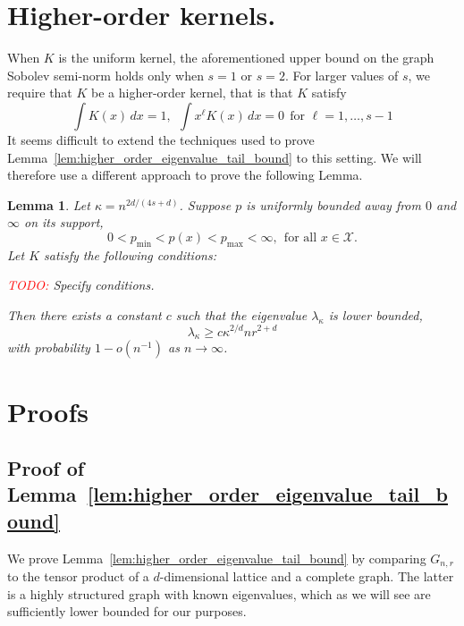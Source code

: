 \documentclass{article}
\newcommand{\1}{\mathbf{1}}
\newcommand{\Xset}{\mathcal{X}}
\theoremstyle{alden}
\theoremstyle{aldenthm}
\newtheorem{lemma}{Lemma}
\theoremstyle{definition}
\theoremstyle{remark}
\begin{document}
\section{Higher-order kernels.}
When $K$ is the uniform kernel, the aforementioned upper bound on the graph Sobolev semi-norm holds only when $s = 1$ or $s = 2$. For larger values of $s$, we require that $K$ be a higher-order kernel, that is that $K$ satisfy
\begin{equation*}
\int K(x) \,dx = 1,~~ \int x^{\ell}K(x) \,dx = 0~~\textrm{for $\ell = 1,\ldots,s-1$}
\end{equation*}
It seems difficult to extend the techniques used to prove Lemma~\ref{lem:higher_order_eigenvalue_tail_bound} to this setting. We will therefore use a different approach to prove the following Lemma.
\begin{lemma}
	Let $\kappa = n^{2d/(4s + d)}$. Suppose $p$ is uniformly bounded away from $0$ and $\infty$ on its support,
	\begin{equation*}
	0 < p_{\min} < p(x) < p_{\max} < \infty,~~\textrm{for all $x \in \Xset$.}
	\end{equation*}
	Let $K$ satisfy the following conditions:
	
	\textcolor{red}{TODO:} Specify conditions.
	
	Then there exists a constant $c$ such that the eigenvalue $\lambda_{\kappa}$ is lower bounded,
	\begin{equation}
	\label{eqn:higher_order_eigenvalue_tail_bound2}
	\lambda_{\kappa} \geq c\kappa^{2/d}nr^{2 + d}
	\end{equation}
	with probability $1 - o(n^{-1})$ as $n \to \infty$.
\end{lemma}

\section{Proofs}

\subsection{Proof of Lemma~\ref{lem:higher_order_eigenvalue_tail_bound}}

We prove Lemma~\ref{lem:higher_order_eigenvalue_tail_bound} by comparing $G_{n,r}$ to the tensor product of a $d$-dimensional lattice and a complete graph. The latter is a highly structured graph with known eigenvalues, which as we will see are sufficiently lower bounded for our purposes.
\end{document}
